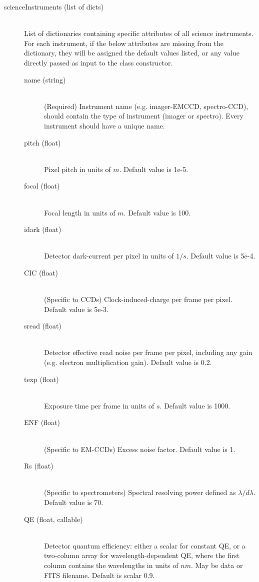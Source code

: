 \documentclass[cleanfoot]{asme2ej}
\begin{document}
\begin{itemize}
\begin{description}
    \item[scienceInstruments (list of dicts)] \hfill\\ List of dictionaries containing specific attributes of all science instruments. For each instrument, if the below attributes are missing from the dictionary, they will be assigned the default values listed, or any value directly passed as input to the class constructor. 
    \begin{description}
        \item[name (string)] \hfill\\ (Required) Instrument name (e.g. imager-EMCCD, spectro-CCD), should contain the type of instrument (imager or spectro). Every instrument should have a unique name.
        \item[pitch (float)] \hfill \\ Pixel pitch in units of $ m $. Default value is 1e-5. 
        \item[focal (float)] \hfill \\ Focal length in units of $ m $. Default value is 100. 
        \item[idark (float)] \hfill \\ Detector dark-current per pixel in units of $ 1/s $. Default value is 5e-4. 
        \item[CIC (float)] \hfill \\ (Specific to CCDs) Clock-induced-charge per frame per pixel. Default value is 5e-3. 
        \item[sread (float)] \hfill \\ Detector effective read noise per frame per pixel, including any gain (e.g. electron multiplication gain). Default value is 0.2.
        \item[texp (float)] \hfill \\ Exposure time per frame in units of $ s $. Default value is 1000. 
        \item[ENF (float)] \hfill \\ (Specific to EM-CCDs) Excess noise factor. Default value is 1. 
        \item[Rs (float)] \hfill \\ (Specific to spectrometers) Spectral resolving power defined as $\lambda/d\lambda$. Default value is 70. 
        \item[QE (float, callable)] \hfill \\ Detector quantum efficiency: either a scalar for constant QE, or a two-column array for wavelength-dependent QE, where the first column contains the wavelengths in units of $ nm $. May be data or FITS filename. Default is scalar 0.9. 

\end{description}
\end{description}
\end{itemize}
\end{document}
